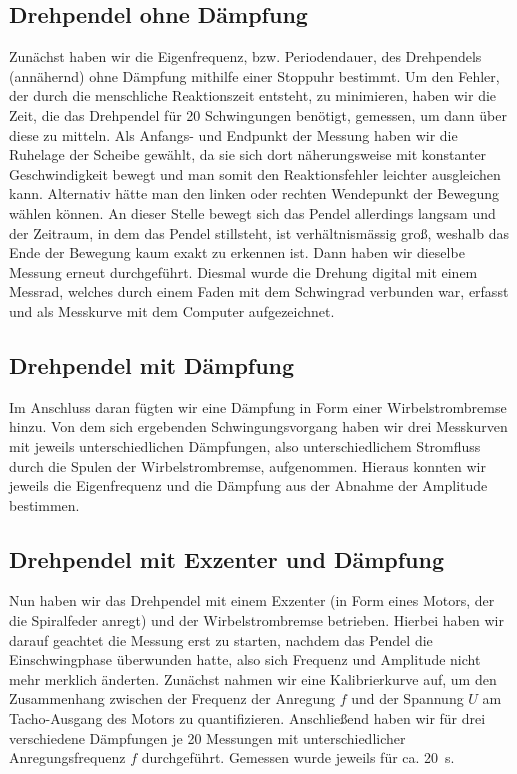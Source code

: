 \documentclass[
	a4paper,
	12pt,
	pagesize,
	ngerman
]{scrartcl}
\begin{document}
	\subsection{Drehpendel ohne Dämpfung}%
	Zunächst haben wir die Eigenfrequenz, bzw. Periodendauer, des Drehpendels (annähernd) ohne Dämpfung mithilfe einer Stoppuhr bestimmt. Um den Fehler, der durch die menschliche Reaktionszeit entsteht, zu minimieren, haben wir die Zeit, die das Drehpendel für 20 Schwingungen benötigt, gemessen, um dann über diese zu mitteln.
	Als Anfangs- und Endpunkt der Messung haben wir die Ruhelage der Scheibe gewählt, da sie sich dort näherungsweise mit konstanter Geschwindigkeit bewegt und man somit den Reaktionsfehler leichter ausgleichen kann.
	Alternativ hätte man den linken oder rechten Wendepunkt der Bewegung wählen können. An dieser Stelle bewegt sich das Pendel allerdings langsam und der Zeitraum, in dem das Pendel stillsteht, ist verhältnismässig groß, weshalb das Ende der Bewegung kaum exakt zu erkennen ist. %
	Dann haben wir dieselbe Messung erneut durchgeführt. Diesmal wurde die Drehung digital mit einem Messrad, welches durch einem Faden mit dem Schwingrad verbunden war, erfasst und als Messkurve mit dem Computer aufgezeichnet.%
	\subsection{Drehpendel mit Dämpfung}
	Im Anschluss daran fügten wir eine Dämpfung in Form einer Wirbelstrombremse hinzu. Von dem sich ergebenden Schwingungsvorgang haben wir drei Messkurven mit jeweils unterschiedlichen Dämpfungen, also unterschiedlichem Stromfluss durch die Spulen der Wirbelstrombremse, aufgenommen. Hieraus konnten wir jeweils die Eigenfrequenz und die Dämpfung aus der Abnahme der Amplitude bestimmen. %
	\subsection{Drehpendel mit Exzenter und Dämpfung} 
	Nun haben wir das Drehpendel mit einem Exzenter (in Form eines Motors, der die Spiralfeder anregt) und der Wirbelstrombremse betrieben. Hierbei haben wir darauf geachtet die Messung erst zu starten, nachdem das Pendel die Einschwingphase überwunden hatte, also sich Frequenz und Amplitude nicht mehr merklich änderten.
	Zunächst nahmen wir eine Kalibrierkurve auf, um den Zusammenhang zwischen der Frequenz der Anregung $ f $ und der Spannung $ U $ am Tacho-Ausgang des Motors zu quantifizieren.
	Anschließend haben wir für drei verschiedene Dämpfungen je 20 Messungen mit unterschiedlicher Anregungsfrequenz $ f $ durchgeführt. Gemessen wurde jeweils für ca. \SI{20}{\second}. 
\end{document}
